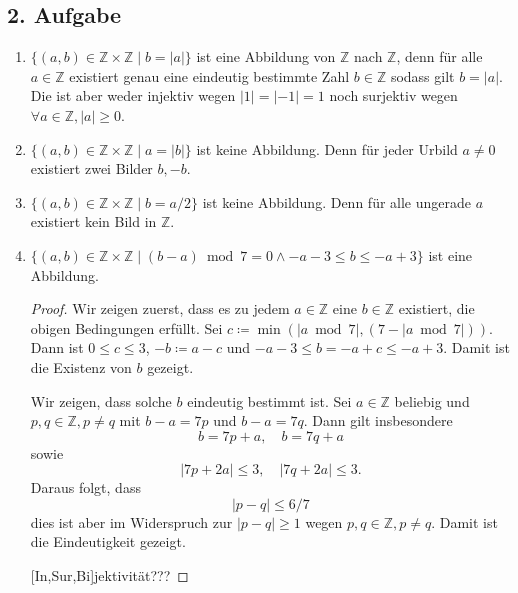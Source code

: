 \documentclass[a5paper]{article}
\providecommand{\abs}[1]{\left\lvert#1\right\rvert}
\theoremstyle{remark}
\begin{document}
\subsection*{2. Aufgabe}
\begin{enumerate}
\item \(\{(a, b) \in \mathbb{Z} \times \mathbb{Z} \mid b = \abs{a}\}\) ist eine Abbildung von \(\mathbb{Z}\)
  nach \(\mathbb{Z}\), denn für alle \(a \in \mathbb{Z}\) existiert genau eine eindeutig
  bestimmte Zahl \(b \in \mathbb{Z}\) sodass gilt \(b = \abs{a}\).  Die ist aber
  weder injektiv wegen \(\abs{1} = \abs{-1} = 1\) noch surjektiv wegen
  \(\forall a \in \mathbb{Z}, \abs{a} \ge 0\).
\item \(\{(a, b) \in \mathbb{Z} \times \mathbb{Z} \mid a = \abs{b}\}\) ist keine Abbildung.  Denn
  für jeder Urbild \(a \ne 0\) existiert zwei Bilder \(b, -b\).
\item \(\{(a, b) \in \mathbb{Z} \times \mathbb{Z} \mid b = a/2\}\) ist keine Abbildung.  Denn für
  alle ungerade \(a\) existiert kein Bild in \(\mathbb{Z}\).
\item \(\{(a, b) \in \mathbb{Z} \times \mathbb{Z} \mid (b-a) \bmod 7 = 0 \wedge -a-3 \le b \le -a+3\}\) ist
  eine Abbildung.
  \begin{proof}
    Wir zeigen zuerst, dass es zu jedem \(a \in \mathbb{Z}\) eine \(b \in
    \mathbb{Z}\) existiert, die obigen Bedingungen erfüllt.  Sei \(c \coloneq
    \min(\abs{a \bmod 7}, (7 - \abs{a \bmod 7}))\).  Dann ist \(0 \le c \le 3\),
    \(-b \coloneq a - c\) und \(-a - 3 \le b = -a + c \le -a + 3\).  Damit ist die
    Existenz von \(b\) gezeigt.

    Wir zeigen, dass solche \(b\) eindeutig bestimmt ist.  Sei \(a \in \mathbb{Z}\)
    beliebig und \(p, q \in \mathbb{Z}, p \ne q\) mit \(b-a = 7p\) und \(b-a = 7q\).
    Dann gilt insbesondere
    \[b = 7p + a, \quad b= 7q + a \]
    sowie
    \[\abs{7p + 2a} \le 3, \quad \abs{7q + 2a} \le 3.\]
    Daraus folgt, dass
    \[\abs{p - q} \le 6/7\]
    dies ist aber im Widerspruch zur \(\abs{p - q} \ge 1\) wegen \(p, q \in
    \mathbb{Z}, p \ne q\).  Damit ist die Eindeutigkeit gezeigt.

    [In,Sur,Bi]jektivität???
  \end{proof}
\end{enumerate}
\end{document}
